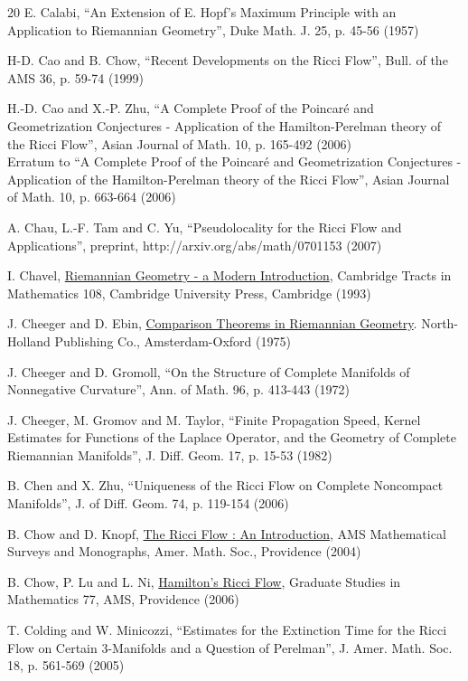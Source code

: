 \documentclass[12pt]{amsart}
\numberwithin{equation}{section}
\theoremstyle{plain}
\theoremstyle{definition}
\theoremstyle{remark}
\begin{document}
\begin{thebibliography}{20}
 E. Calabi,
``An Extension of E. Hopf's Maximum Principle with an Application to 
Riemannian Geometry'',
Duke Math. J. 25, p. 45-56 (1957)

 H-D. Cao and B. Chow,
``Recent Developments on the Ricci Flow'', Bull. of the AMS 36, p. 59-74 (1999)

 H.-D. Cao and X.-P. Zhu,
``A Complete Proof of the Poincar\'e and Geometrization Conjectures - Application of the Hamilton-Perelman theory of the Ricci Flow'',
Asian Journal of Math. 10, p. 165-492 (2006) \\
Erratum to
``A Complete Proof of the Poincar\'e and Geometrization Conjectures - Application of the Hamilton-Perelman theory of the Ricci Flow'',  Asian Journal of Math. 10, p. 663-664 (2006)            

 A. Chau, L.-F. Tam and C. Yu,
``Pseudolocality for the Ricci Flow and Applications'',
preprint, http://arxiv.org/abs/math/0701153 (2007)

 I. Chavel,
\underline{Riemannian Geometry - a Modern Introduction}, 
Cambridge Tracts in Mathematics 108, 
Cambridge University Press, Cambridge (1993)

 J. Cheeger and D. Ebin,
\underline{Comparison Theorems in Riemannian Geometry}. 
North-Holland Publishing Co., Amsterdam-Oxford (1975)

 J. Cheeger and D. Gromoll,
``On the Structure of Complete Manifolds of Nonnegative Curvature'', 
Ann. of Math. 96, p. 413-443 (1972)

 J. Cheeger, M. Gromov and M. Taylor,
``Finite Propagation Speed, Kernel Estimates for Functions of the
Laplace Operator, and the Geometry of Complete Riemannian Manifolds'',
J. Diff. Geom. 17, p. 15-53 (1982)

 B. Chen and X. Zhu,
``Uniqueness of the Ricci Flow on Complete
Noncompact Manifolds'', J. of Diff. Geom. 74, p. 119-154
(2006)

 B. Chow and D. Knopf,
\underline{The Ricci Flow : An Introduction}, AMS Mathematical Surveys and
Monographs, Amer. Math. Soc., Providence (2004)

 B. Chow, P. Lu and L. Ni, \underline{Hamilton's Ricci Flow},
Graduate Studies in Mathematics 77, AMS, Providence (2006)

 T. Colding and W. Minicozzi,
``Estimates for the Extinction Time for the Ricci Flow on Certain 3-Manifolds and a 
Question of Perelman'',
J. Amer. Math. Soc. 18, p.  561-569 (2005)


\end{thebibliography}
\end{document}
